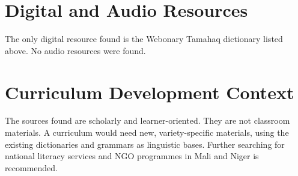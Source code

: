 \documentclass[12pt]{article}
\begin{document}
\section{Digital and Audio Resources}
The only digital resource found is the Webonary Tamahaq dictionary listed above. No audio resources were found.

\section{Curriculum Development Context}
The sources found are scholarly and learner-oriented. They are not classroom materials. A curriculum would need new, variety-specific materials, using the existing dictionaries and grammars as linguistic bases. Further searching for national literacy services and NGO programmes in Mali and Niger is recommended.
\end{document}
